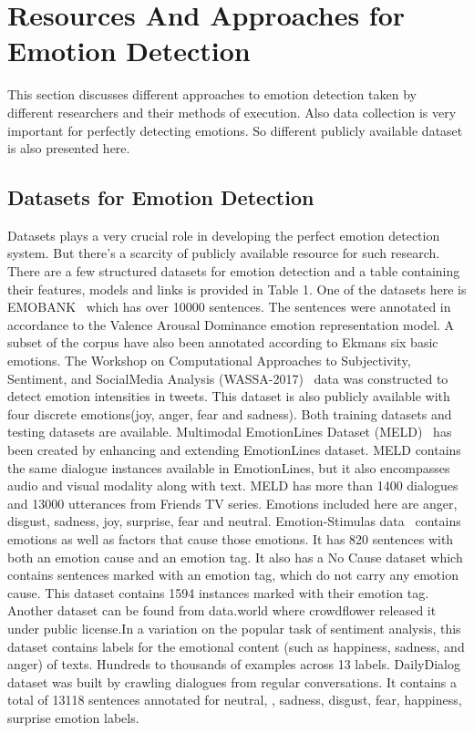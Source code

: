 \documentclass[runningheads]{llncs}
\begin{document}
\section{Resources And Approaches for Emotion Detection}
This section discusses different approaches to emotion detection taken by different researchers and their methods of execution. Also data collection is very important for perfectly detecting emotions. So different publicly available dataset is also presented here. 

\subsection{Datasets for Emotion Detection}
Datasets plays a very crucial role in developing the perfect emotion detection system. But there's a scarcity of publicly available resource for such research. There are a few structured datasets for emotion detection and a table containing their features, models and links is provided in Table 1.
One of the datasets here is EMOBANK~\cite{ref15,ref16} which has over 10000 sentences. The sentences were annotated in accordance to the Valence Arousal Dominance emotion representation model. A subset of the corpus have also been annotated according to Ekmans six basic emotions. The Workshop on Computational Approaches to Subjectivity, Sentiment, and SocialMedia Analysis (WASSA-2017)~\cite{ref19} data was constructed to detect emotion intensities in tweets. This dataset is also publicly available with four discrete emotions(joy,  anger, fear and sadness). Both training datasets and testing datasets are available. Multimodal EmotionLines Dataset (MELD)~\cite{ref17,ref18} has been created by enhancing and extending EmotionLines dataset. MELD contains the same dialogue instances available in EmotionLines, but it also encompasses audio and visual modality along with text. MELD has more than 1400 dialogues and 13000 utterances from Friends TV series. Emotions included here are anger, disgust, sadness, joy, surprise, fear and neutral. Emotion-Stimulas data~\cite{ref20} contains emotions as well as factors that cause those emotions. It has 820 sentences with both an emotion cause and an emotion tag. It also has a No Cause dataset which contains sentences marked with an emotion tag, which do not carry any emotion cause. This dataset contains 1594 instances marked with their emotion tag. Another dataset can be found from data.world where crowdflower released it under public license.In a variation on the popular task of sentiment analysis, this dataset contains labels for the emotional content (such as happiness, sadness, and anger) of texts. Hundreds to thousands of examples across 13 labels. DailyDialog~\cite{ref21} dataset was built by crawling dialogues from regular conversations. It contains a total of 13118 sentences annotated for neutral, , sadness, disgust, fear, happiness, surprise emotion labels.
\end{document}
